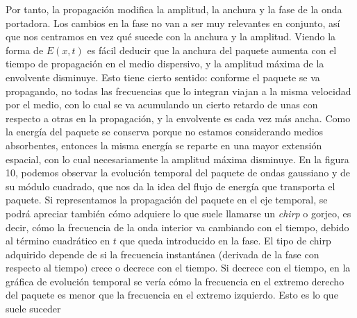 \documentclass[12pt,a4paper]{report}
\begin{document}
	Por tanto, la propagación modifica la amplitud, la anchura y la fase de la onda portadora. Los cambios en la fase no van a ser muy relevantes en conjunto, así que nos centramos en vez qué sucede con la anchura y la amplitud. Viendo la forma de $E(x, t)$ es fácil deducir que la anchura del paquete aumenta con el tiempo de propagación en el medio dispersivo, y la amplitud máxima de la envolvente disminuye. Esto tiene cierto sentido: conforme el paquete se va propagando, no todas las frecuencias que lo integran viajan a la misma velocidad por el medio, con lo cual se va acumulando un cierto retardo de unas con respecto a otras en la propagación, y la envolvente es cada vez más ancha. Como la energía del paquete se conserva porque no estamos considerando medios absorbentes, entonces la misma energía se reparte en una mayor extensión espacial, con lo cual necesariamente la amplitud máxima disminuye. En la figura 10, podemos observar la evolución temporal del paquete de ondas gaussiano y de su módulo cuadrado, que nos da la idea del flujo de energía que transporta el paquete. Si representamos la propagación del paquete en el eje temporal, se podrá apreciar también cómo adquiere lo que suele llamarse un \textit{chirp} o gorjeo, es decir, cómo la frecuencia de la onda interior va cambiando con el tiempo, debido al término cuadrático en $t$ que queda introducido en la fase. El tipo de chirp adquirido depende de si la frecuencia instantánea (derivada de la fase con respecto al tiempo) crece o decrece con el tiempo. Si decrece con el tiempo, en la gráfica de evolución temporal se vería cómo la frecuencia en el extremo derecho del paquete es menor que la frecuencia en el extremo izquierdo. Esto es lo que suele suceder

	\printbibliography[title={Bibliografía}]
\end{document}

